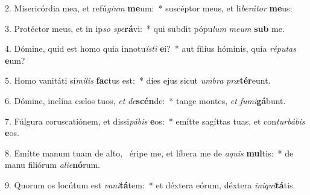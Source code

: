 2. Misericórdia mea, et refú\textit{gi}\textit{um} \textbf{me}um:~*  suscéptor meus, et li\textit{be}\textit{rá}\textit{tor} \textbf{me}us:\

3. Protéctor meus, et in ip\textit{so} \textit{spe}\textbf{rá}vi:~*  qui subdit pópu\textit{lum} \textit{me}\textit{um} \textbf{sub} me.\

4. Dómine, quid est homo quia innotu\textit{ís}\textit{ti} \textbf{e}i?~*  aut fílius hóminis, quia \textit{ré}\textit{pu}\textit{tas} \textbf{e}um?\

5. Homo vanitáti sí\textit{mi}\textit{lis} \textbf{fac}tus est:~*  dies ejus sicut \textit{um}\textit{bra} \textit{præ}\textbf{tér}eunt.\

6. Dómine, inclína cælos tuos, \textit{et} \textit{de}\textbf{scén}de:~*  tange montes, \textit{et} \textit{fu}\textit{mi}\textbf{gá}bunt.\

7. Fúlgura coruscatiónem, et dissi\textit{pá}\textit{bis} \textbf{e}os:~*  emítte sagíttas tuas, et con\textit{tur}\textit{bá}\textit{bis} \textbf{e}os.\

8. Emítte manum tuam de alto, \dag\  éripe me, et líbera me de \textit{a}\textit{quis} \textbf{mul}tis:~*  de manu filiórum \textit{a}\textit{li}\textit{e}\textbf{nó}rum.\

9. Quorum os locútum est \textit{va}\textit{ni}\textbf{tá}tem:~*  et déxtera eórum, déxtera \textit{in}\textit{i}\textit{qui}\textbf{tá}tis.\

